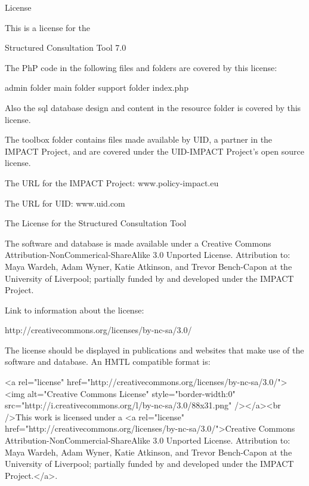 License

This is a license for the

Structured Consultation Tool 7.0

The PhP code in the following files and folders are covered by this license:

admin folder
main folder
support folder
index.php

Also the sql database design and content in the resource folder is covered by this license.

The toolbox folder contains files made available by UID, a partner in the IMPACT Project, and are covered under the UID-IMPACT Project's open source license.

The URL for the IMPACT Project:  www.policy-impact.eu

The URL for UID:    www.uid.com

The License for the Structured Consultation Tool

The software and database is made available under a Creative Commons Attribution-NonCommerical-ShareAlike 3.0 Unported License.  Attribution to:  Maya Wardeh, Adam Wyner, Katie Atkinson, and Trevor Bench-Capon at the University of Liverpool; partially funded by and developed under the IMPACT Project.

Link to information about the license:

http://creativecommons.org/licenses/by-nc-sa/3.0/

The license should be displayed in publications and websites that make use of the software and database.  An HMTL compatible format is:

<a rel="license" href="http://creativecommons.org/licenses/by-nc-sa/3.0/"><img alt="Creative Commons License" style="border-width:0" src="http://i.creativecommons.org/l/by-nc-sa/3.0/88x31.png" /></a><br />This work is licensed under a <a rel="license" href="http://creativecommons.org/licenses/by-nc-sa/3.0/">Creative Commons Attribution-NonCommercial-ShareAlike 3.0 Unported License.  Attribution to:  Maya Wardeh, Adam Wyner, Katie Atkinson, and Trevor Bench-Capon at the University of Liverpool; partially funded by and developed under the IMPACT Project.</a>.